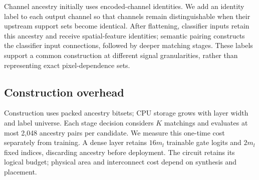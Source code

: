 Channel ancestry initially uses encoded-channel identities. We add an identity label to each output channel so that channels remain distinguishable when their upstream support sets become identical. After flattening, classifier inputs retain this ancestry and receive spatial-feature identities; semantic pairing constructs the classifier input connections, followed by deeper matching stages. These labels support a common construction at different signal granularities, rather than representing exact pixel-dependence sets.

\subsection{Construction overhead}

Construction uses packed ancestry bitsets; CPU storage grows with layer width and label universe. Each stage decision considers $K$ matchings and evaluates at most 2,048 ancestry pairs per candidate. We measure this one-time cost separately from training. A dense layer retains $16m_l$ trainable gate logits and $2m_l$ fixed indices, discarding ancestry before deployment. The circuit retains its logical budget; physical area and interconnect cost depend on synthesis and placement.


